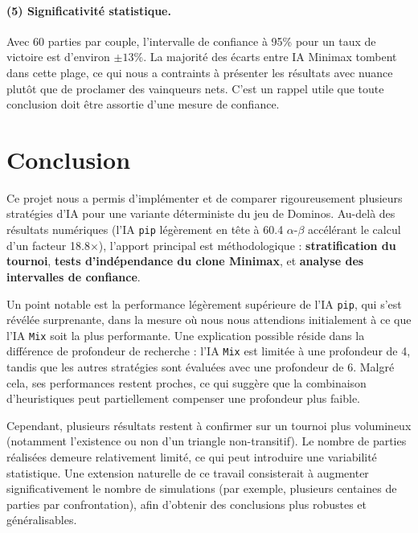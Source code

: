\documentclass[11pt,a4paper]{article}
\begin{document}
\paragraph{(5) Significativité statistique.} Avec 60 parties par couple,
l'intervalle de confiance à 95\% pour un taux de victoire est d'environ
$\pm 13\%$. La majorité des écarts entre IA Minimax tombent dans cette plage,
ce qui nous a contraints à présenter les résultats avec nuance plutôt que de
proclamer des vainqueurs nets. C'est un rappel utile que toute conclusion
doit être assortie d'une mesure de confiance.

\section*{Conclusion}



Ce projet nous a permis d’implémenter et de comparer rigoureusement plusieurs stratégies
d’IA pour une variante déterministe du jeu de Dominos. Au-delà des résultats numériques (l’IA
\texttt{pip} légèrement en tête à 60.4%
\(\alpha\)-\(\beta\) accélérant le calcul d’un facteur 18.8$\times$), l’apport principal est
méthodologique : \textbf{stratification du tournoi}, \textbf{tests d’indépendance du clone
Minimax}, et \textbf{analyse des intervalles de confiance}.

Un point notable est la performance légèrement supérieure de l’IA \texttt{pip}, qui s’est révélée
surprenante, dans la mesure où nous nous attendions initialement à ce que l’IA \texttt{Mix} soit
la plus performante. Une explication possible réside dans la différence de profondeur de recherche :
l’IA \texttt{Mix} est limitée à une profondeur de 4, tandis que les autres stratégies sont évaluées
avec une profondeur de 6. Malgré cela, ses performances restent proches, ce qui suggère que la
combinaison d’heuristiques peut partiellement compenser une profondeur plus faible.

Cependant, plusieurs résultats restent à confirmer sur un tournoi plus volumineux (notamment
l’existence ou non d’un triangle non-transitif). Le nombre de parties réalisées demeure relativement
limité, ce qui peut introduire une variabilité statistique. Une extension naturelle de ce travail
consisterait à augmenter significativement le nombre de simulations (par exemple, plusieurs centaines
de parties par confrontation), afin d’obtenir des conclusions plus robustes et généralisables.
\end{document}
